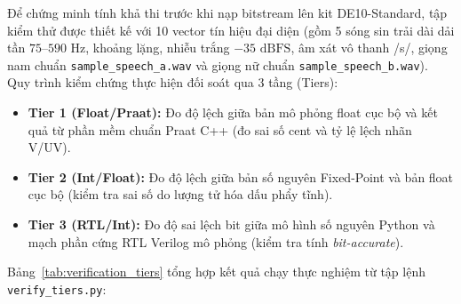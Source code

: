 \documentclass[11pt,a4paper]{article}
\begin{document}
Để chứng minh tính khả thi trước khi nạp bitstream lên kit DE10-Standard, tập kiểm thử được thiết kế với 10 vector tín hiệu đại diện (gồm 5 sóng sin trải dài dải tần $75\text{--}590\text{ Hz}$, khoảng lặng, nhiễu trắng $-35\text{ dBFS}$, âm xát vô thanh /s/, giọng nam chuẩn \texttt{sample\_speech\_a.wav} và giọng nữ chuẩn \texttt{sample\_speech\_b.wav}). Quy trình kiểm chứng thực hiện đối soát qua 3 tầng (Tiers):
\begin{itemize}
    \setlength{\itemsep}{0.5pt}
    \item \textbf{Tier 1 (Float/Praat):} Đo độ lệch giữa bản mô phỏng float cục bộ và kết quả từ phần mềm chuẩn Praat C++ (đo sai số cent và tỷ lệ lệch nhãn V/UV).
    \item \textbf{Tier 2 (Int/Float):} Đo độ lệch giữa bản số nguyên Fixed-Point và bản float cục bộ (kiểm tra sai số do lượng tử hóa dấu phẩy tĩnh).
    \item \textbf{Tier 3 (RTL/Int):} Đo độ sai lệch bit giữa mô hình số nguyên Python và mạch phần cứng RTL Verilog mô phỏng (kiểm tra tính \emph{bit-accurate}).
\end{itemize}

Bảng~\ref{tab:verification_tiers} tổng hợp kết quả chạy thực nghiệm từ tập lệnh \texttt{verify\_tiers.py}:
\end{document}
